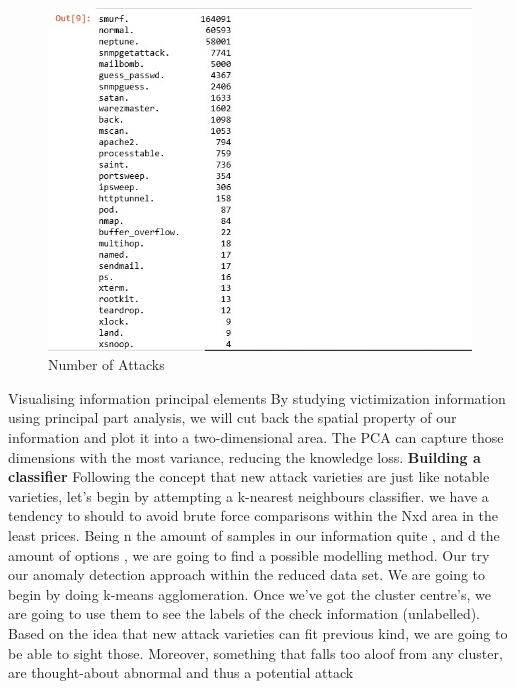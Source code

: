 \begin{figure}
    \centering
    \includegraphics{texfiles/images/number_of_attacks.jpg}
    \caption{Number of Attacks}
    \label{fig:Attack Identification}
\end{figure}
  Visualising information  principal elements
By studying victimization information using principal part analysis, we will cut back the spatial property of our information and plot it into a two-dimensional area. The PCA can capture those dimensions with the most variance, reducing the knowledge loss. 
\textbf{Building a classifier} 
Following the concept that new attack varieties are just like notable varieties, let's begin by attempting a k-nearest neighbours classifier. we have a tendency to should to avoid brute force comparisons within the Nxd area in the least prices. Being n the amount of samples in our information quite , and d the amount of options , we are going to find a possible modelling 
method. Our try our anomaly detection approach within the reduced data set. We are going to begin by doing k-means agglomeration. Once we've got the cluster centre’s, we are going to use them to see the labels of the check information (unlabelled). Based on the idea that new attack varieties can fit previous kind, we are going to be able to sight those. Moreover, something that falls too aloof from any cluster, are thought-about abnormal and thus a potential attack


